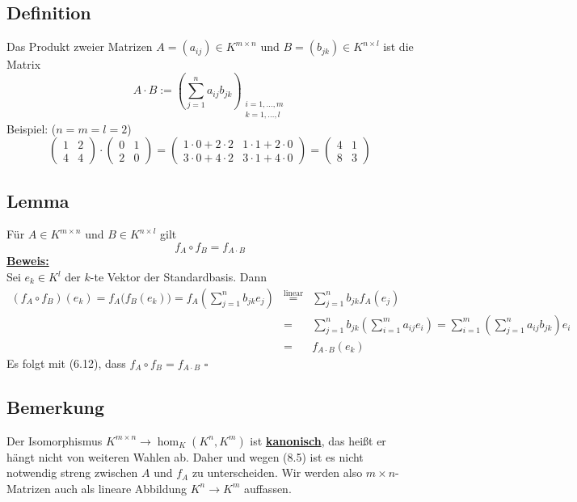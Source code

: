 \subsection{Definition} %
\label{sub:definition}
Das Produkt zweier Matrizen $A= (a_{ij}) \in K^{m \times n}$ und $B= (b_{jk}) \in K^{n \times l}$ ist die Matrix
\[
	A \cdot B := \left(  \sum\limits_{j=1}^{n} a_{ij} b_{jk} \right)_{\substack{i=1, \ldots , m \\ k=1, \ldots , l}}
\]
Beispiel: ($n=m=l=2$)
\[
	\begin{pmatrix}
		1 & 2 \\
		4 & 4
	\end{pmatrix}
	\cdot \begin{pmatrix}
		0 & 1 \\
		2 & 0
	\end{pmatrix} = \begin{pmatrix}
		1 \cdot 0 +2 \cdot 2 & 1 \cdot 1 + 2 \cdot 0 \\
		3 \cdot 0 +4 \cdot 2 & 3 \cdot 1 + 4 \cdot 0
	\end{pmatrix} = \begin{pmatrix}
		4 & 1 \\
		8 & 3
	\end{pmatrix}
\]

\subsection{Lemma} %
\label{sub:lemma}
Für $A \in K^{m \times n}$ und $B \in K^{n \times l}$ gilt
\[
	f_A \circ f_B = f_{A \cdot B}
\]
\underline{\textbf{Beweis:}} \\
Sei $e_k \in K^l$ der $k$-te Vektor der Standardbasis. Dann
\[
	\begin{array}{rcl}
	(f_A \circ f_B)(e_k)= f_A \big(f_B(e_k)\big)=f_A \left(\sum\limits_{j=1}^{n} b_{jk} e_j\right) & 
	\overset{\text{linear}}{=} & \sum\limits_{j=1}^{n} b_{jk} f_A(e_j) \\
	& = & \sum\limits_{j=1}^{n} b_{jk} \left( \sum\limits_{i=1}^{m} a_{ij} e_i \right) = \sum\limits_{i=1}^{m} \left(  \sum\limits_{j=1}^{n} 
	a_{ij} b_{jk}\right) e_i  \\
	& = & f_{A \cdot B}(e_k)
\end{array}
\]
Es folgt mit (6.12), dass $f_A \circ f_B = f_{A \cdot B}$ \hfill \( \square \)

\subsection{Bemerkung} %
\label{sub:bemerkung}
Der Isomorphismus $K^{m \times n} \to \hom_K (K^n, K^m)$ ist \underline{\textbf{kanonisch}}, das heißt er hängt nicht von weiteren Wahlen ab. 
Daher und wegen (8.5) ist es nicht notwendig streng zwischen $A$ und $f_A$ zu unterscheiden. Wir werden also \(m \times n \)-Matrizen auch
als lineare Abbildung $K^n \to K^m$ auffassen.

